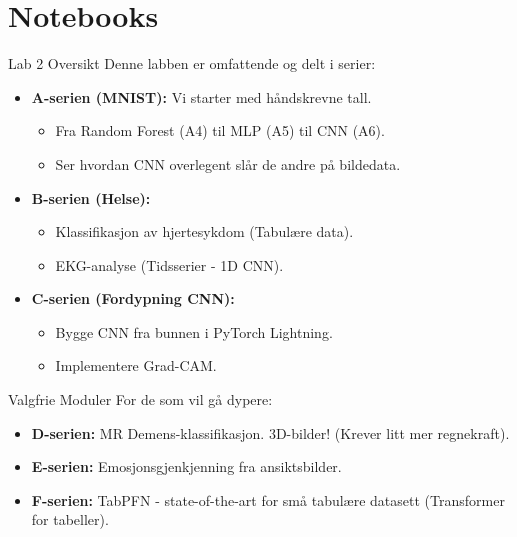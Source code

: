 \documentclass[aspectratio=169]{beamer}
\begin{document}
\section{Notebooks}
\begin{frame}{Lab 2 Oversikt}
    Denne labben er omfattende og delt i serier:
    
    \begin{itemize}
        \item \textbf{A-serien (MNIST):} Vi starter med håndskrevne tall.
        \begin{itemize}
            \item Fra Random Forest (A4) til MLP (A5) til CNN (A6).
            \item Ser hvordan CNN overlegent slår de andre på bildedata.
        \end{itemize}
        
        \item \textbf{B-serien (Helse):}
        \begin{itemize}
            \item Klassifikasjon av hjertesykdom (Tabulære data).
            \item EKG-analyse (Tidsserier - 1D CNN).
        \end{itemize}
        
        \item \textbf{C-serien (Fordypning CNN):}
        \begin{itemize}
            \item Bygge CNN fra bunnen i PyTorch Lightning.
            \item Implementere Grad-CAM.
        \end{itemize}
    \end{itemize}
\end{frame}

\begin{frame}{Valgfrie Moduler}
    For de som vil gå dypere:
    
    \begin{itemize}
        \item \textbf{D-serien:} MR Demens-klassifikasjon. 3D-bilder! (Krever litt mer regnekraft).
        \item \textbf{E-serien:} Emosjonsgjenkjenning fra ansiktsbilder.
        \item \textbf{F-serien:} TabPFN - state-of-the-art for små tabulære datasett (Transformer for tabeller).
    \end{itemize}
\end{frame}
\end{document}
